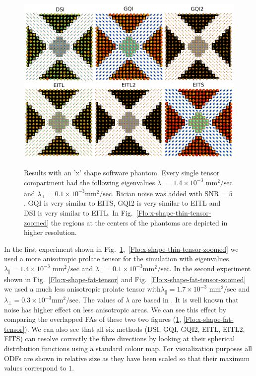 \documentclass{bioinfo}
\begin{document}
%
\begin{figure}
[th!]

\begin{centering}
\includegraphics[scale=0.14]{figures/software_phantom_comparisons_rician_05}
\par\end{centering}

\caption{Results with an 'x' shape software phantom. Every single tensor compartment
had the following eigenvalues $\lambda_{\parallel}=1.4\times10^{-3}$
\foreignlanguage{british}{$\textrm{mm}^{2}/\textrm{sec}$} and $\lambda_{\perp}=0.1\times10^{-3}\textrm{mm}^{2}/\textrm{sec}$.
Rician noise was added with SNR = $5$. GQI is very similar to EITS,
GQI2 is very similar to EITL and DSI is very similar to EITL. In Fig.~\ref{Flo:x-shape-thin-tensor-zoomed}
the regions at the centers of the phantoms are depicted in higher
resolution.}


\centering{}\label{Flo:x-shape-thin-tensor}
\end{figure}


In the first experiment shown in Fig.~\ref{Flo:x-shape-thin-tensor},~\ref{Flo:x-shape-thin-tensor-zoomed}
we used a more anisotropic prolate tensor for the simulation with
eigenvalues $\lambda_{\parallel}=1.4\times10^{-3}$ \foreignlanguage{british}{$\textrm{mm}^{2}/\textrm{sec}$}
and $\lambda_{\perp}=0.1\times10^{-3}\textrm{mm}^{2}/\textrm{sec}$.
In the second experiment shown in Fig.~\ref{Flo:x-shape-fat-tensor}
and Fig.~\ref{Flo:x-shape-fat-tensor-zoomed} we used a much less
anisotropic prolate tensor with$\lambda_{\parallel}=1.7\times10^{-3}$
\foreignlanguage{british}{$\textrm{mm}^{2}/\textrm{sec}$} and $\lambda_{\perp}=0.3\times10^{-3}\textrm{mm}^{2}/\textrm{sec}$.
The values of $\lambda$ are based in \citet{canalesrodriguez2009}.
It is well known that noise has higher effect on less anisotropic
areas. We can see this effect by comparing the overlapped FAs of these
two two figures (\ref{Flo:x-shape-thin-tensor}, \ref{Flo:x-shape-fat-tensor}).
We can also see that all six methods (DSI, GQI, GQI2, EITL, EITL2,
EITS) can resolve correctly the fibre directions by looking at their
spherical distribution functions using a standard colour map. For
visualization purposes all ODFs are shown in relative size as they
have been scaled so that their maximum values correspond to $1$. 
\end{document}
